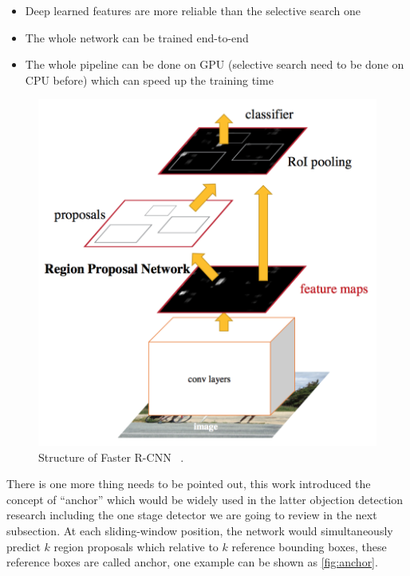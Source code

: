 \begin{itemize}
    \item Deep learned features are more reliable than the selective search one
    \item The whole network can be trained end-to-end
    \item The whole pipeline can be done on GPU (selective search need to be
    done on CPU before) which can speed up the training time
\end{itemize}

\begin{figure}
    \begin{center}
        \includegraphics[scale=0.5]{figures/faster_r_cnn.png}
    \end{center}
    \caption{Structure of Faster R-CNN ~\protect\cite{faster-r-cnn-paper-2015}.}
    \label{fig:faster-r-cnn}
\end{figure}

There is one more thing needs to be pointed out, this work introduced the
concept of ``anchor'' which would be widely
used in the latter objection detection research including the one stage
detector we are going to review in the next subsection.
At each sliding-window position, the network would simultaneously predict $k$
region proposals which relative to
$k$ reference bounding boxes, these reference boxes are called anchor, one example
can be shown as \autoref{fig:anchor}.

